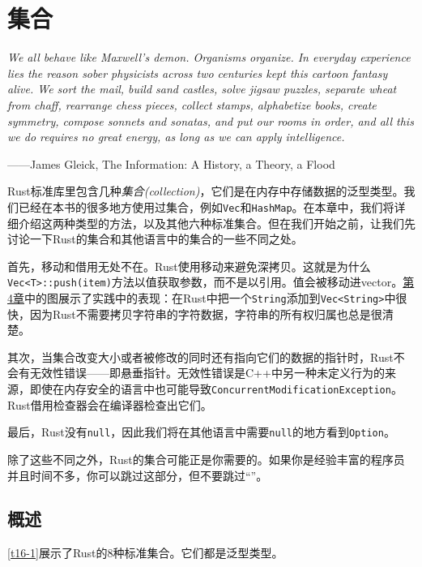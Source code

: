 \chapter{集合}\label{ch16}

\emph{We all behave like Maxwell’s demon. Organisms organize. In everyday experience lies the reason sober physicists across two centuries kept this cartoon fantasy alive. We sort the mail, build sand castles, solve jigsaw puzzles, separate wheat from chaff, rearrange chess pieces, collect stamps, alphabetize books, create symmetry, compose sonnets and sonatas, and put our rooms in order, and all this we do requires no great energy, as long as we can apply intelligence.}

\begin{flushright}
    ——James Gleick, The Information: A History, a Theory, a Flood
\end{flushright}

Rust标准库里包含几种\emph{集合(collection)}，它们是在内存中存储数据的泛型类型。我们已经在本书的很多地方使用过集合，例如\texttt{Vec}和\texttt{HashMap}。在本章中，我们将详细介绍这两种类型的方法，以及其他六种标准集合。但在我们开始之前，让我们先讨论一下Rust的集合和其他语言中的集合的一些不同之处。

首先，移动和借用无处不在。Rust使用移动来避免深拷贝。这就是为什么\texttt{Vec<T>::push(item)}方法以值获取参数，而不是以引用。值会被移动进vector。\hyperref[ch04]{第4章}中的图展示了实践中的表现：在Rust中把一个\texttt{String}添加到\texttt{Vec<String>}中很快，因为Rust不需要拷贝字符串的字符数据，字符串的所有权归属也总是很清楚。

其次，当集合改变大小或者被修改的同时还有指向它们的数据的指针时，Rust不会有无效性错误——即悬垂指针。无效性错误是C++中另一种未定义行为的来源，即使在内存安全的语言中也可能导致\texttt{ConcurrentModificationException}。Rust借用检查器会在编译器检查出它们。

最后，Rust没有\texttt{null}，因此我们将在其他语言中需要\texttt{null}的地方看到\texttt{Option}。

除了这些不同之外，Rust的集合可能正是你需要的。如果你是经验丰富的程序员并且时间不多，你可以跳过这部分，但不要跳过“”。

\section{概述}

\autoref{t16-1}展示了Rust的8种标准集合。它们都是泛型类型。


